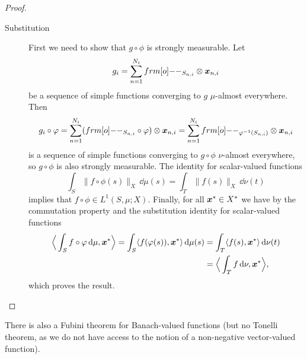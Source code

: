 \begin{proof}
\begin{description}
  \item[Substitution]
    First we need to show that $g \circ \phi$ is strongly measurable.
    Let
    \begin{equation*}
      g_i = \sum_{n=1}^{N_i} \1_{S_{n,i}} \otimes \mb{x}_{n,i}
    \end{equation*}
    be a sequence of simple functions converging to $g$ $\mu$-almost everywhere.
    Then
    \begin{equation*}
      g_i \circ \phi = \sum_{n=1}^{N_i} (\1_{S_{n,i}} \circ \phi) \otimes \mb{x}_{n,i} = \sum_{n=1}^{N_i} \1_{\phi^{-1}(S_{n,i})} \otimes \mb{x}_{n,i}
    \end{equation*}
    is a sequence of simple functions converging to $g \circ \phi$ $\nu$-almost everywhere, so $g \circ \phi$ is also strongly measurable.
    The identity for scalar-valued functions
    \begin{equation*}
      \int_S \|f \circ \phi(s)\|_X \, \dd\mu(s) = \int_T \|f(s)\|_X \, \dd\nu(t)
    \end{equation*}
    implies that $f \circ \phi \in L^1(S,\mu;X)$.
    Finally, for all $\bm{x}^* \in X^*$ we have by the commutation property and the substitution identity for scalar-valued functions
    \begin{equation*}
      \begin{aligned}
        \Big\langle \int_S f \circ \varphi \, \mathrm{d}\mu , \bm{x}^* \Big\rangle
        = \int_S \langle f(\varphi(s)), \bm{x}^* \rangle \, \mathrm{d}\mu(s)
        &= \int_T \langle f(s), \bm{x}^* \rangle \, \mathrm{d}\nu(t) \\
        &= \Big\langle \int_T f \, \mathrm{d}\nu, \bm{x}^* \Big\rangle,
      \end{aligned}
    \end{equation*}
    which proves the result.
  \end{description}
\end{proof}

There is also a Fubini theorem for Banach-valued functions (but no Tonelli theorem, as we do not have access to the notion of a non-negative vector-valued function).

